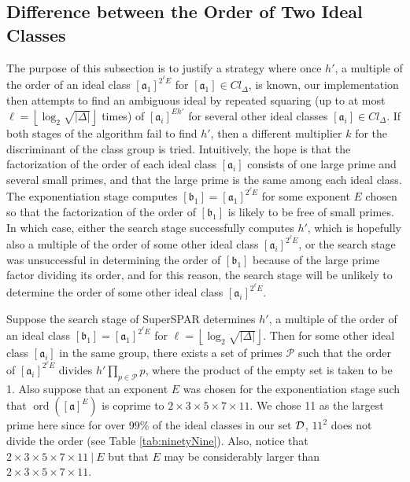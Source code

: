\documentclass{ucalgthes1}
\theoremstyle{definition}
\DeclareMathOperator{\ord}{ord}
\newcommand{\floor}[1]{\left\lfloor #1 \right\rfloor}
\newcommand{\set}{\mathcal}
\newcommand{\ideal}{\mathfrak}
\newcommand{\idealclass}[1]{\left[ \ideal #1 \right]}
\newcommand{\aclass}{\idealclass a}
\newcommand{\hdelta}{\sqrt{|\Delta|}}
\begin{document}
\subsection{Difference between the Order of Two Ideal Classes}
\label{subsec:ssparDiffBtwOrder}

The purpose of this subsection is to justify a strategy where once $h'$, a multiple of the order of an ideal class $\idealclass{a_1}^{2^\ell E}$ for $\idealclass{a_1} \in Cl_\Delta$, is known, our implementation then attempts to find an ambiguous ideal by repeated squaring (up to at most $\ell = \floor{\log_2 \hdelta}$ times) of $\idealclass{a_i}^{Eh'}$ for several other ideal classes $\idealclass{a_i} \in Cl_\Delta$.  If both stages of the algorithm fail to find $h'$, then a different multiplier $k$ for the discriminant of the class group is tried.  Intuitively, the hope is that the factorization of the order of each ideal class $\idealclass{a_i}$ consists of one large prime and several small primes, and that the large prime is the same among each ideal class.  The exponentiation stage computes $\idealclass{b_1} = \idealclass{a_1}^{2^\ell E}$ for some exponent $E$ chosen so that the factorization of the order of $\idealclass{b_1}$ is likely to be free of small primes.  In which case, either the search stage successfully computes $h'$, which is hopefully also a multiple of the order of some other ideal class $\idealclass{a_i}^{2^\ell E}$, or the search stage was unsuccessful in determining the order of $\idealclass{b_1}$ because of the large prime factor dividing its order, and for this reason, the search stage will be unlikely to determine the order of some other ideal class $\idealclass{a_i}^{2^\ell E}$.

Suppose the search stage of SuperSPAR determines $h'$, a multiple of the order of an ideal class $\idealclass{b_1} = \idealclass{a_1}^{2^\ell E}$ for $\ell = \floor{\log_2 \hdelta}$.  Then for some other ideal class $\idealclass{a_i}$ in the same group, there exists a set of primes $\set P$ such that the order of $\idealclass{a_i}^{2^\ell E}$ divides $h' \prod_{p \in \set P} p$, where the product of the empty set is taken to be 1.  Also suppose that an exponent $E$ was chosen for the exponentiation stage such that $\ord(\aclass^E)$ is coprime to $2 \times 3 \times 5 \times 7 \times 11$.  We chose 11 as the largest prime here since for over 99\% of the ideal classes in our set $\idealDataSet$, $11^2$ does not divide the order (see Table \ref{tab:ninetyNine}).  Also, notice that $2 \times 3 \times 5 \times 7 \times 11 ~|~ E$ but that $E$ may be considerably larger than $2 \times 3 \times 5 \times 7 \times 11$.
\end{document}
